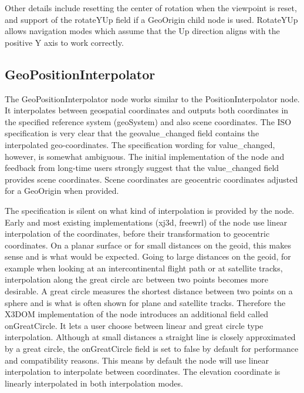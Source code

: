 \documentclass{acmsiggraph}                     %
\begin{document}
Other details include resetting the center of rotation when the viewpoint is reset, and support of the rotateYUp field if a GeoOrigin child node is used. RotateYUp allows navigation modes which assume that the Up direction aligns with the positive Y axis to work correctly.


\subsection{GeoPositionInterpolator}

The GeoPositionInterpolator node works similar to the PositionInterpolator node. It interpolates between geospatial coordinates and outputs both coordinates in the specified reference system (geoSystem) and also scene coordinates. The ISO specification is very clear that the geovalue\_changed field contains the interpolated geo-coordinates. The specification wording for value\_changed, however, is somewhat ambiguous. The initial implementation of the node \cite{reddy2000} and feedback from long-time users strongly suggest that the value\_changed field provides scene coordinates. Scene coordinates are geocentric coordinates adjusted for a GeoOrigin when provided.

The specification is silent on what kind of interpolation is provided by the node. Early \cite{reddy2000} and most existing implementations (xj3d, freewrl) of the node use linear interpolation of the coordinates, before their transformation to geocentric coordinates. On a planar surface or for small distances on the geoid, this makes sense and is what would be expected. Going to large distances on the geoid, for example when looking at an intercontinental flight path or at satellite tracks, interpolation along the great circle arc between two points becomes more desirable. A great circle measures the shortest distance between two points on a sphere and is what is often shown for plane and satellite tracks. Therefore the X3DOM implementation of the node introduces an additional field called onGreatCircle. It lets a user choose between linear and great circle type interpolation. Although at small distances a  straight line is closely approximated by a great circle, the onGreatCircle field is set to false by default for performance and compatibility reasons. This means by default the node will use linear interpolation to interpolate between coordinates. The elevation coordinate is linearly interpolated in both interpolation modes.
\end{document}
